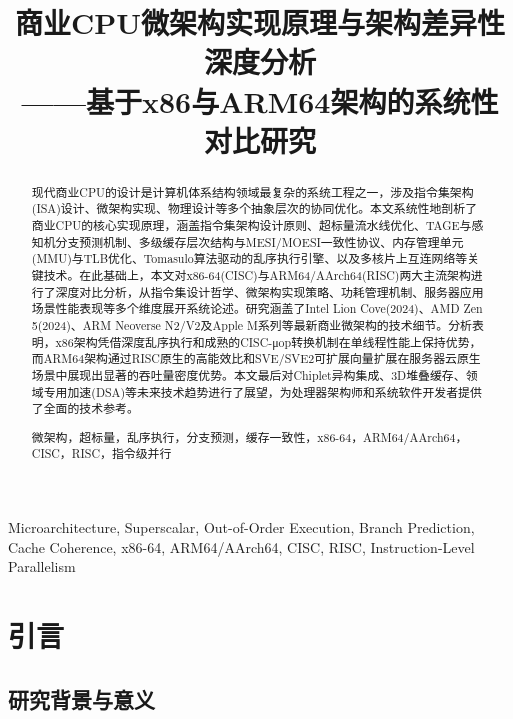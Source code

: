\documentclass[12pt,a4paper]{IEEEtran}
\title{\bfseries 商业CPU微架构实现原理与架构差异性深度分析\\
{\large ——基于x86与ARM64架构的系统性对比研究}}
\author{
  \IEEEauthorblockN{深度技术研究报告}
  \IEEEauthorblockA{计算机体系结构领域\\
  2025年8月}
}
\begin{document}
\maketitle

\begin{abstract}
现代商业CPU的设计是计算机体系结构领域最复杂的系统工程之一，涉及指令集架构(ISA)设计、微架构实现、物理设计等多个抽象层次的协同优化。本文系统性地剖析了商业CPU的核心实现原理，涵盖指令集架构设计原则、超标量流水线优化、TAGE与感知机分支预测机制、多级缓存层次结构与MESI/MOESI一致性协议、内存管理单元(MMU)与TLB优化、Tomasulo算法驱动的乱序执行引擎、以及多核片上互连网络等关键技术。在此基础上，本文对x86-64(CISC)与ARM64/AArch64(RISC)两大主流架构进行了深度对比分析，从指令集设计哲学、微架构实现策略、功耗管理机制、服务器应用场景性能表现等多个维度展开系统论述。研究涵盖了Intel Lion Cove(2024)、AMD Zen 5(2024)、ARM Neoverse N2/V2及Apple M系列等最新商业微架构的技术细节。分析表明，x86架构凭借深度乱序执行和成熟的CISC-μop转换机制在单线程性能上保持优势，而ARM64架构通过RISC原生的高能效比和SVE/SVE2可扩展向量扩展在服务器云原生场景中展现出显著的吞吐量密度优势。本文最后对Chiplet异构集成、3D堆叠缓存、领域专用加速(DSA)等未来技术趋势进行了展望，为处理器架构师和系统软件开发者提供了全面的技术参考。

微架构，超标量，乱序执行，分支预测，缓存一致性，x86-64，ARM64/AArch64，CISC，RISC，指令级并行
\end{abstract}

\begin{IEEEkeywords}
Microarchitecture, Superscalar, Out-of-Order Execution, Branch Prediction, Cache Coherence, x86-64, ARM64/AArch64, CISC, RISC, Instruction-Level Parallelism
\end{IEEEkeywords}

\section{引言}

\subsection{研究背景与意义}
\end{document}
